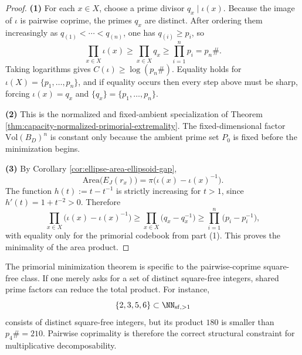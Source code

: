 \begin{proof}
\textbf{(1)} For each \(x\in X\), choose a prime divisor \(q_x\mid \iota(x)\). Because the image of \(\iota\) is pairwise coprime, the primes \(q_x\) are distinct. After ordering them increasingly as \(q_{(1)}<\cdots<q_{(n)}\), one has \(q_{(i)}\ge p_i\), so
\[
\prod_{x\in X}\iota(x)\ge \prod_{x\in X}q_x\ge \prod_{i=1}^{n}p_i=p_n\#.
\]
Taking logarithms gives \(C(\iota)\ge \log(p_n\#)\). Equality holds for \(\iota(X)=\{p_1,\dots,p_n\}\), and if equality occurs then every step above must be sharp, forcing \(\iota(x)=q_x\) and \(\{q_x\}=\{p_1,\dots,p_n\}\).

\textbf{(2)} This is the normalized and fixed-ambient specialization of Theorem \ref{thm:capacity-normalized-primorial-extremality}. The fixed-dimensional factor \(\mathrm{Vol}(B_D)^n\) is constant only because the ambient prime set \(P_0\) is fixed before the minimization begins.

\textbf{(3)} By Corollary \ref{cor:ellipse-area-ellipsoid-gap},
\[
\mathrm{Area}\bigl(E_J(r_x)\bigr)=\pi\bigl(\iota(x)-\iota(x)^{-1}\bigr).
\]
The function \(h(t):=t-t^{-1}\) is strictly increasing for \(t>1\), since \(h'(t)=1+t^{-2}>0\). Therefore
\[
\prod_{x\in X}\bigl(\iota(x)-\iota(x)^{-1}\bigr)
\ge
\prod_{x\in X}\bigl(q_x-q_x^{-1}\bigr)
\ge
\prod_{i=1}^{n}\bigl(p_i-p_i^{-1}\bigr),
\]
with equality only for the primorial codebook from part (1). This proves the minimality of the area product.
\end{proof}

\begin{remark}\label{rem:min-total-godel-cost-coprime-necessity}
The primorial minimization theorem is specific to the pairwise-coprime square-free class. If one merely asks for a set of distinct square-free integers, shared prime factors can reduce the total product. For instance,
\[
\{2,3,5,6\}\subset \NN_{\mathrm{sf},>1}
\]
consists of distinct square-free integers, but its product \(180\) is smaller than \(p_4\#=210\). Pairwise coprimality is therefore the correct structural constraint for multiplicative decomposability.
\end{remark}

\endinput


